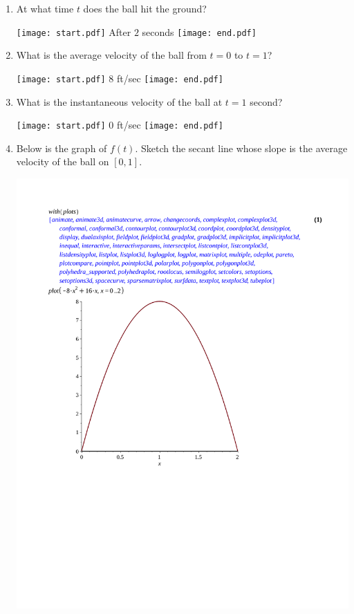 \documentclass[12pt]{article}
\begin{document}
\begin{enumerate}
\begin{enumerate}

\item  At what time $t$ does the ball hit the ground? 

\texttt{[image: start.pdf]}
{{After $2$ seconds}}
\texttt{[image: end.pdf]}


\item What is the average velocity of the ball from $t=0$ to $t=1$? 

\texttt{[image: start.pdf]}
{{8 ft/sec}}
\texttt{[image: end.pdf]}


\item What is the instantaneous velocity of the ball at $t=1$ second?

\texttt{[image: start.pdf]}
{{0 ft/sec}}
\texttt{[image: end.pdf]}
 

\newpage

\item Below is the graph of $f(t)$.  Sketch the secant line whose slope is the average velocity of the ball on $[0,1]$.\\

\begin{center}
\includegraphics[scale=0.5]{graph2.pdf}
\end{center} 


\end{enumerate}
\end{enumerate}
\end{document}
